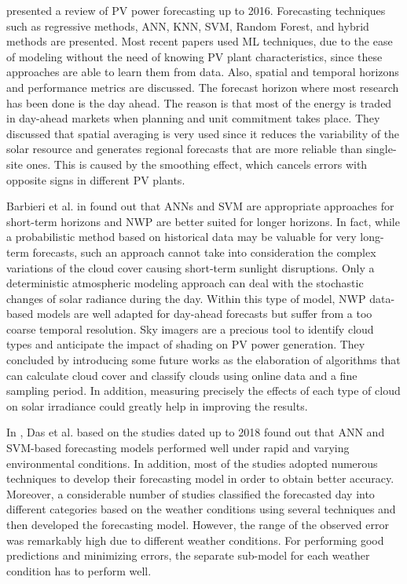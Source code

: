 \cite{ANTONANZAS201678} presented a review of PV power forecasting up to 2016.
Forecasting techniques such as regressive methods, ANN, KNN, SVM, Random Forest, and hybrid methods are presented.
Most recent papers used ML techniques, due to the ease of modeling without the need of knowing PV plant characteristics, since these approaches are able to learn them from data.
Also, spatial and temporal horizons and performance metrics are discussed.
The forecast horizon where most research has been done is the day ahead.
The reason is that most of the energy is traded in day-ahead markets when planning and unit commitment takes place.
They discussed that spatial averaging is very used since it reduces the variability of the solar resource and generates regional forecasts that are more reliable than single-site ones.
This is caused by the smoothing effect, which cancels errors with opposite signs in different PV plants.

Barbieri et al. in \cite{BARBIERI2017242} found out that ANNs and SVM are appropriate approaches for short-term horizons and NWP are better suited for longer horizons.
In fact, while a probabilistic method based on historical data may be valuable for very long-term forecasts, such an approach cannot take into consideration the complex variations of the cloud cover causing short-term sunlight disruptions.
Only a deterministic atmospheric modeling approach can deal with the stochastic changes of solar radiance during the day.
Within this type of model, NWP data-based models are well adapted for day-ahead forecasts but suffer from a too coarse temporal resolution.
Sky imagers are a precious tool to identify cloud types and anticipate the impact of shading on PV power generation.
They concluded by introducing some future works as the elaboration of algorithms that can calculate cloud cover and classify clouds using online data and a fine sampling period.
In addition, measuring precisely the effects of each type of cloud on solar irradiance could greatly help in improving the results.

In \cite{DAS2018912}, Das et al. based on the studies dated up to 2018 found out that ANN and SVM-based forecasting models performed well under rapid and varying environmental conditions.
In addition, most of the studies adopted numerous techniques to develop their forecasting model in order to obtain better accuracy.
Moreover, a considerable number of studies classified the forecasted day into different categories based on the weather conditions using several techniques and then developed the forecasting model.
However, the range of the observed error was remarkably high due to different weather conditions.
For performing good predictions and minimizing errors, the separate sub-model for each weather condition has to perform well.

